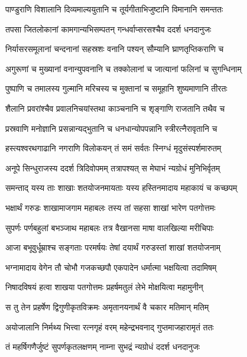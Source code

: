 \twolineshloka
{पाण्डुराणि विशालानि दिव्यमाल्ययुतानि च}
{तूर्यगीताभिजुष्टानि विमानानि समन्ततः} %

\twolineshloka
{तपसा जितलोकानां कामगान्यभिसम्पतन्}
{गन्धर्वाप्सरसश्चैव ददर्श धनदानुजः} %

\twolineshloka
{निर्यासरसमूलानां चन्दनानां सहस्रशः}
{वनानि पश्यन् सौम्यानि घ्राणतृप्तिकराणि च} %

\twolineshloka
{अगुरूणां च मुख्यानां वनान्युपवनानि च}
{तक्कोलानां च जात्यानां फलिनां च सुगन्धिनाम्} %

\twolineshloka
{पुष्पाणि च तमालस्य गुल्मानि मरिचस्य च}
{मुक्तानां च समूहानि शुष्यमाणानि तीरतः} %

\twolineshloka
{शैलानि प्रवरांश्चैव प्रवालनिचयांस्तथा}
{काञ्चनानि च शृङ्गाणि राजतानि तथैव च} %

\twolineshloka
{प्रस्रवाणि मनोज्ञानि प्रसन्नान्यद्भुतानि च}
{धनधान्योपपन्नानि स्त्रीरत्नैरावृतानि च} %

\twolineshloka
{हस्त्यश्वरथगाढानि नगराणि विलोकयन्}
{तं समं सर्वतः स्निग्धं मृदुसंस्पर्शमारुतम्} %

\twolineshloka
{अनूपे सिन्धुराजस्य ददर्श त्रिदिवोपमम्}
{तत्रापश्यत् स मेघाभं न्यग्रोधं मुनिभिर्वृतम्} %

\twolineshloka
{समन्ताद् यस्य ताः शाखाः शतयोजनमायताः}
{यस्य हस्तिनमादाय महाकायं च कच्छपम्} %

\twolineshloka
{भक्षार्थं गरुडः शाखामाजगाम महाबलः}
{तस्य तां सहसा शाखां भारेण पतगोत्तमः} %

\twolineshloka
{सुपर्णः पर्णबहुलां बभञ्जाथ महाबलः}
{तत्र वैखानसा माषा वालखिल्या मरीचिपाः} %

\twolineshloka
{आजा बभूवुर्धूम्राश्च सङ्गताः परमर्षयः}
{तेषां दयार्थं गरुडस्तां शाखां शतयोजनाम्} %

\twolineshloka
{भग्नामादाय वेगेन तौ चोभौ गजकच्छपौ}
{एकपादेन धर्मात्मा भक्षयित्वा तदामिषम्} %

\twolineshloka
{निषादविषयं हत्वा शाखया पतगोत्तमः}
{प्रहर्षमतुलं लेभे मोक्षयित्वा महामुनीन्} %

\twolineshloka
{स तु तेन प्रहर्षेण द्विगुणीकृतविक्रमः}
{अमृतानयनार्थं वै चकार मतिमान् मतिम्} %

\twolineshloka
{अयोजालानि निर्मथ्य भित्त्वा रत्नगृहं वरम्}
{महेन्द्रभवनाद् गुप्तमाजहारामृतं ततः} %

\twolineshloka
{तं महर्षिगणैर्जुष्टं सुपर्णकृतलक्षणम्}
{नाम्ना सुभद्रं न्यग्रोधं ददर्श धनदानुजः} %

